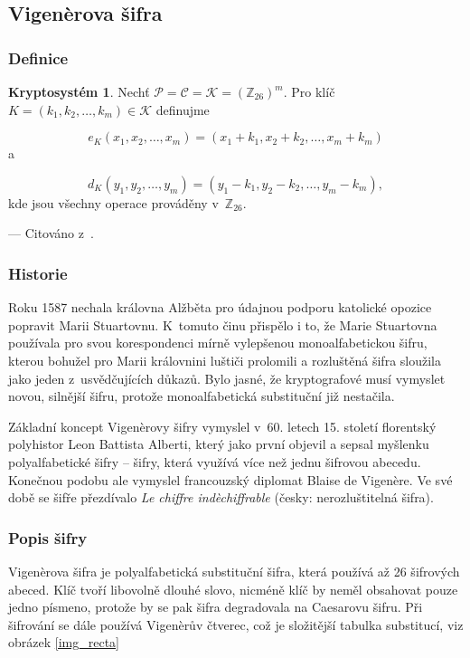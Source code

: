 \documentclass[12pt]{article}
\theoremstyle{definition}
\newtheorem{crypto}{Kryptosystém}
\newcommand{\cit}[1]{--- Citováno z~\cite{#1}.}
\newcommand{\setp}{\mathcal{P}}
\newcommand{\setc}{\mathcal{C}}
\newcommand{\setk}{\mathcal{K}}
\newcommand{\setz}{\mathbb{Z}}
\newcommand{\alp}{_{26}}
\begin{document}
\subsection{Vigenèrova šifra}
\label{vigcipher}
\subsubsection{Definice}
\begin{crypto}
Nechť $\setp=\setc=\setk=\left(\setz\alp\right)^m$. Pro klíč $K=\left(k_1,k_2,\ldots,k_m\right)\in\setk$ definujme

$$e_K\left(x_1,x_2,\ldots,x_m\right) = \left(x_1+k_1,x_2+k_2,\ldots,x_m+k_m\right)$$
a

$$d_K\left(y_1,y_2,\ldots,y_m\right)=\left(y_1-k_1, y_2-k_2,\ldots,y_m-k_m\right),$$
kde jsou všechny operace prováděny v~$\setz\alp$.
\end{crypto}

\cit{cryptography}

\subsubsection{Historie}
Roku 1587 nechala královna Alžběta pro údajnou podporu katolické opozice popravit Marii Stuartovnu. K~tomuto činu přispělo i to, že Marie Stuartovna používala pro svou korespondenci mírně vylepšenou monoalfabetickou šifru, kterou bohužel pro Marii královnini luštiči prolomili a rozluštěná šifra sloužila jako jeden z~usvědčujících důkazů. Bylo jasné, že kryptografové musí vymyslet novou, silnější šifru, protože monoalfabetická substituční již nestačila.

Základní koncept Vigenèrovy šifry vymyslel v~60. letech 15. století florentský polyhistor Leon Battista Alberti, který jako první objevil a sepsal myšlenku polyalfabetické šifry -- šifry, která využívá více než jednu šifrovou abecedu. Konečnou podobu ale vymyslel francouzský diplomat Blaise de Vigenère. Ve své době se šifře přezdívalo {\em Le chiffre indèchiffrable} (česky: nerozluštitelná šifra). 

\subsubsection{Popis šifry}
Vigenèrova šifra je polyalfabetická substituční šifra, která používá až 26 šifrových abeced. Klíč tvoří libovolně dlouhé slovo, nicméně klíč by neměl obsahovat pouze jedno písmeno, protože by se pak šifra degradovala na Caesarovu šifru. Při šifrování se dále používá Vigenèrův čtverec, což je složitější tabulka substitucí, viz obrázek \ref{img_recta}
\end{document}
